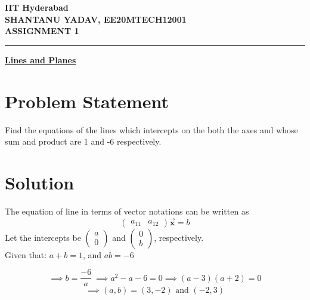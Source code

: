 \documentclass[12pt]{article}
\begin{document}
\begin{center}
	{\Large \bf IIT Hyderabad} \\ \vspace{2ex}
	{\large \bf SHANTANU YADAV, EE20MTECH12001 }\\
	\vspace{2ex}
	{\large \bf ASSIGNMENT 1} \\
\end{center}
	\hrule

\vspace{2ex}
\begin{center}
{\underline{\Large \bf Lines and Planes}}
\end{center}

\section*{Problem Statement}
Find the equations of the lines which intercepts on the both the axes and whose sum and product are 1 and -6 respectively.

\section*{Solution}
The equation of line in terms of vector notations can be written as
\begin{equation}
\begin{pmatrix}
	a_{11} & a_{12}
\end{pmatrix}
	\vec{\mathbf{x}} = b	\label{eq2}
\end{equation}
Let the intercepts be 
$\displaystyle
\begin{pmatrix}
	a \\ 0
\end{pmatrix}$
and 
$\displaystyle
\begin{pmatrix}
	0 \\ b
\end{pmatrix}$, respectively. \\

\noindent
Given that: \qquad \quad $ a + b = 1 $, \qquad and \qquad \quad $ ab = -6$ 

\begin{equation*}
\implies b = \frac{-6}{a} \  
\implies a^2 - a -6 =0
\implies (a-3)(a+2)=0
\end{equation*}
\begin{equation}
	\implies (a,b)=(3,-2) \text{ and } (-2,3)
\end{equation}
\end{document}
